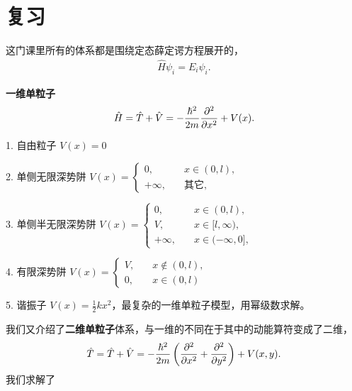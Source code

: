 \section{复习}

这门课里所有的体系都是围绕定态薛定谔方程展开的，
\begin{align}
    \hat H \psi_i = E_i \psi_i.
\end{align}

\textbf{一维单粒子}
\begin{align}
    \hat H = \hat T + \hat V = -\frac{\hbar^2}{2m} \pdv[2]x + V(x). 
\end{align}

1. 自由粒子  $V(x) = 0$

2. 单侧无限深势阱
$V(x) = \begin{cases}
    0, \quad &x\in(0,l),\\
    +\infty, \quad &\text{其它},
\end{cases}$

3. 单侧半无限深势阱 $V(x)=\begin{cases}
    0, \quad &x\in(0,l), \\
    V, \quad &x\in[l,\infty), \\
    +\infty, \quad &x\in(-\infty, 0], 
\end{cases}$

4. 有限深势阱 $V(x) = \begin{cases}
    V, \quad &x \notin (0,l), \\
    0, \quad &x\in(0,l)
\end{cases}$


5. 谐振子 $V(x) = \frac12 kx^2$，最复杂的一维单粒子模型，用幂级数求解。

我们又介绍了\textbf{二维单粒子}体系，与一维的不同在于其中的动能算符变成了二维，
\begin{align}
    \hat T = \hat T + \hat V = -\frac{\hbar^2}{2m} \left(\pdv[2]x + \pdv[2]y\right) + V(x,y). 
\end{align}
我们求解了

